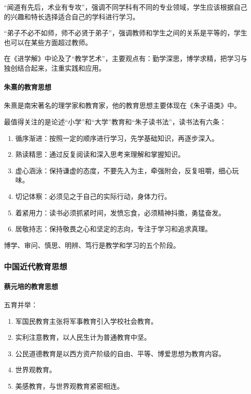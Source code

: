 \documentclass[b5paper,11pt]{article}
\begin{document}
“闻道有先后，术业有专攻”，强调不同学科有不同的专业领域，学生应该根据自己的兴趣和特长选择适合自己的学科进行学习。

“弟子不必不如师，师不必贤于弟子”，强调教师和学生之间的关系是平等的，学生也可以在某些方面超过教师。

在《进学解》中论及了\textcolor{ctp-red}{“教学艺术”}，主要观点有：勤学深思，博学求精，把学习与独创结合起来，注重实践和应用。

\paragraph{朱熹的教育思想} 朱熹是南宋著名的理学家和教育家，他的教育思想主要体现在《朱子语类》中。

最值得关注的是\textcolor{ctp-red}{论述“小学”和“大学”教育}和“朱子读书法”，读书法有六条：
\begin{enumerate}
  \item 循序渐进：按照一定的顺序进行学习，先学基础知识，再逐步深入。
  \item 熟读精思：通过反复阅读和深入思考来理解和掌握知识。
  \item 虚心涵泳：保持谦虚的态度，不要先入为主，牵强附会，反复咀嚼，细心玩味。
  \item 切记体察：必须见之于自己的实际行动，身体力行。
  \item 着紧用力：读书必须抓紧时间，发愤忘食，必须精神抖擞，勇猛奋发。
  \item 居敬持志：保持敬畏之心和坚定的志向，专注于学习和追求真理。
\end{enumerate}

\noindent
\textcolor{ctp-red}{博学、审问、慎思、明辨、笃行}是教学和学习的五个阶段。

\subsubsection{中国近代教育思想}
\paragraph{蔡元培的教育思想} 五育并举：
\textcolor{ctp-rosewater}{
  \begin{enumerate}
    \item 军国民教育主张将军事教育引入学校社会教育。
    \item 实利注意教育，以人民生计为普通教育中坚。
    \item 公民道德教育是以西方资产阶级的自由、平等、博爱思想为教育内容。
    \item 世界观教育。
    \item 美感教育，与世界观教育紧密相连。
  \end{enumerate}
}
\end{document}
